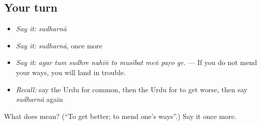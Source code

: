 \subsection*{Your turn}
\begin{itemize}
\raggedright
  \item \emph{Say it:} \emph{sudharnā}
  \item \emph{Say it:} \emph{sudharnā}, once more
  \item \emph{Say it:} \emph{agar tum sudhre nahīṅ to musībat meṅ paṛo ge.} — If you do not mend your ways, you will land in trouble.
  \item \emph{Recall:} say the Urdu for common, then the Urdu for to get worse, then say \emph{sudharnā} again
\end{itemize}

\begin{tcolorbox}[breakable,colback=teal!4,colframe=teal!35!black,title={Before you move on}]
What does  mean? (\textquotedblleft{}To get better; to mend one's ways\textquotedblright{}.) Say it once more.
\end{tcolorbox}

